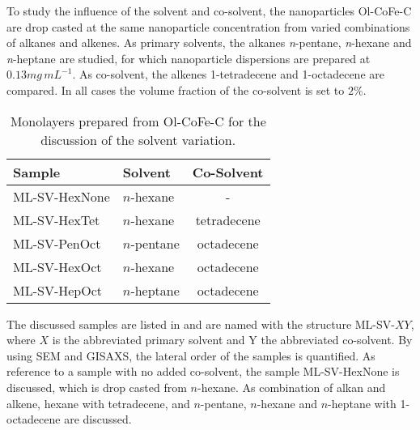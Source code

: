 \documentclass[\main/dresen_thesis.tex]{subfiles}
\begin{document}
      To study the influence of the solvent and co-solvent, the nanoparticles Ol-CoFe-C are drop casted at the same nanoparticle concentration from varied combinations of alkanes and alkenes.
      As primary solvents, the alkanes \textit{n}-pentane, \textit{n}-hexane and \textit{n}-heptane are studied, for which nanoparticle dispersions are prepared at $0.13 \unit{mg \, mL^{-1}}$.
      As co-solvent, the alkenes 1-tetradecene and 1-octadecene are compared.
      In all cases the volume fraction of the co-solvent is set to $2 \%$.
      \begin{table}[!htbp]
        \centering
        \caption{\label{tab:monolayers:charMethod:varyAlkaneAlkene}Monolayers prepared from Ol-CoFe-C for the discussion of the solvent variation.}
        \begin{tabular}{ l | l | c }
          \textbf{Sample} & Solvent              & Co-Solvent \\
          \hline
          ML-SV-HexNone   & $\mathit{n}$-hexane  & -          \\
          ML-SV-HexTet    & $\mathit{n}$-hexane  & tetradecene\\
          ML-SV-PenOct    & $\mathit{n}$-pentane & octadecene \\
          ML-SV-HexOct    & $\mathit{n}$-hexane  & octadecene \\
          ML-SV-HepOct    & $\mathit{n}$-heptane & octadecene \\
          \hline
        \end{tabular}
      \end{table}

      The discussed samples are listed in  and are named with the structure ML-SV-$XY$, where $X$ is the abbreviated primary solvent and Y the abbreviated co-solvent.
      By using SEM and GISAXS, the lateral order of the samples is quantified.
      As reference to a sample with no added co-solvent, the sample ML-SV-HexNone is discussed, which is drop casted from $\mathit{n}$-hexane.
      As combination of alkan and alkene, hexane with tetradecene, and $\mathit{n}$-pentane, $\mathit{n}$-hexane and $\mathit{n}$-heptane with 1-octadecene are discussed.
\end{document}
